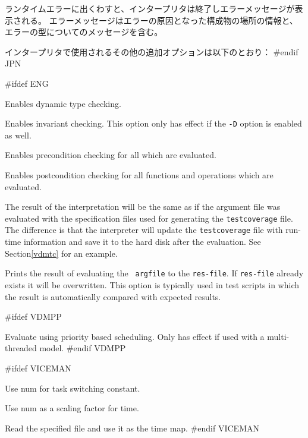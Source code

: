 \documentclass[\pformat,12pt]{article}
\begin{document}
ランタイムエラーに出くわすと、インタープリタは終了しエラーメッセージが表示される。
エラーメッセージはエラーの原因となった構成物の場所の情報と、エラーの型についてのメッセージを含む。

インタープリタで使用されるその他の追加オプションは以下のとおり： 
#endif JPN

\begin{description}

#ifdef ENG
\item[{\tt -D}] Enables dynamic type checking.
  
\item[{\tt -I}] Enables invariant checking. This option only has effect if the {\tt -D} option is enabled as well.

\item[{\tt -P}] Enables precondition checking for all
which are evaluated. 

\item[{\tt -Q}] Enables postcondition checking for all functions and
operations which are evaluated.

\item[{\tt -R}] 
  The result of the interpretation will be the same as if the argument
  file was evaluated with the specification files used for generating
  the {\tt testcoverage} file. The difference is that the interpreter
  will update the {\tt testcoverage} file with run-time information and
  save it to the hard disk after the evaluation. See Section\ref{vdmtc}
  for an example.
  
\item[{\tt -O res-file}] Prints the result of evaluating the {\tt
    argfile} to the {\tt res-file}. If {\tt res-file} already exists
  it will be overwritten. This option is typically used in test
  scripts in which the result is automatically compared with expected
  results.

#ifdef VDMPP
\item[{\tt -Z priority-file}] Evaluate using priority based
  scheduling. Only has effect if used with a multi-threaded model.
#endif VDMPP

#ifdef VICEMAN
\item[{\tt -T num}] Use num for task switching constant.
\item[{\tt -X num}] Use num as a scaling factor for time.
\item[{\tt -F time-file}] 
                    Read the specified file and use it as the time map.
#endif VICEMAN


\end{description}
\end{document}
